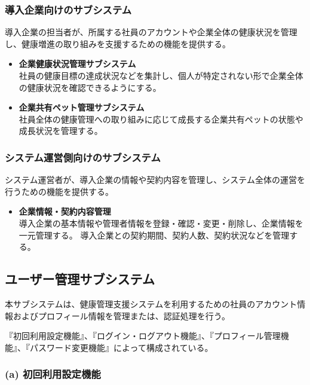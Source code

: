 \documentclass{jlreq}
\begin{document}
\subsubsection{導入企業向けのサブシステム}

導入企業の担当者が、所属する社員のアカウントや企業全体の健康状況を管理し、健康増進の取り組みを支援するための機能を提供する。

\begin{itemize}
    \item \textbf{企業健康状況管理サブシステム}\\
    社員の健康目標の達成状況などを集計し、個人が特定されない形で企業全体の健康状況を確認できるようにする。

    \item \textbf{企業共有ペット管理サブシステム}\\
    社員全体の健康管理への取り組みに応じて成長する企業共有ペットの状態や成長状況を管理する。
\end{itemize}

\subsubsection{システム運営側向けのサブシステム}

システム運営者が、導入企業の情報や契約内容を管理し、システム全体の運営を行うための機能を提供する。

\begin{itemize}
    \item \textbf{企業情報・契約内容管理}\\
    導入企業の基本情報や管理者情報を登録・確認・変更・削除し、企業情報を一元管理する。
    導入企業との契約期間、契約人数、契約状況などを管理する。
\end{itemize}


\subsection{ユーザー管理サブシステム}

本サブシステムは、健康管理支援システムを利用するための社員のアカウント情報およびプロフィール情報を管理または、認証処理を行う。

『初回利用設定機能』、『ログイン・ログアウト機能』、『プロフィール管理機能』、『パスワード変更機能』によって構成されている。

\subsubsection*{(a) 初回利用設定機能}
\end{document}
